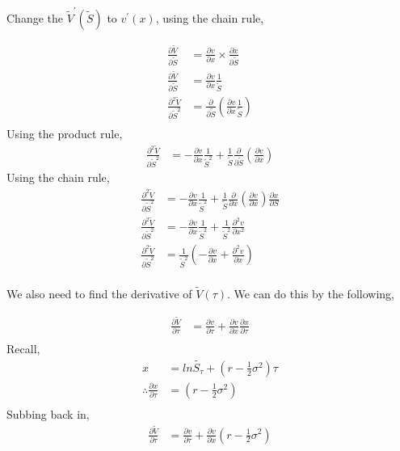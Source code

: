 \documentclass[12pt]{article}
\begin{document}
Change the $\tilde{V}^\prime (\tilde{S})$ to $v^\prime(x)$, using the chain rule,

\begin{align*}
\frac{\partial \tilde{V}}{\partial \tilde{S}} &= \frac{\partial v}{\partial x}\times \frac{\partial x}{\partial \tilde{S}} \\
\frac{\partial \tilde{V}}{\partial \tilde{S}} &= \frac{\partial v}{\partial x}\frac{1}{\tilde{S}} \\
\frac{\partial ^2\tilde{V}}{\partial \tilde{S}^2} &= \frac{\partial}{\partial \tilde{S}}\left(\frac{\partial v}{\partial x}\frac{1}{\tilde{S}}\right) \\
\end{align*}                                     
Using the product rule,
\begin{align*}
\frac{\partial ^2\tilde{V}}{\partial \tilde{S}^2} &= -\frac{\partial v}{\partial x}\frac{1}{\tilde{S}^2} + \frac{1}{\tilde{S}}\frac{\partial}{\partial\tilde{S}}\left(\frac{\partial v}{\partial x}\right)
\end{align*}
Using the chain rule,
\begin{align*}
\frac{\partial ^2\tilde{V}}{\partial \tilde{S}^2} &= -\frac{\partial v}{\partial x}\frac{1}{\tilde{S}^2} + \frac{1}{\tilde{S}}\frac{\partial}{\partial x}\left(\frac{\partial v}{\partial x}\right)\frac{\partial x}{\partial S} \\
\frac{\partial ^2\tilde{V}}{\partial \tilde{S}^2} &= - \frac{\partial v}{\partial x}\frac{1}{\tilde{S}^2} + \frac{1}{\tilde{S}^2}\frac{\partial ^2 v}{\partial x^2} \\
\frac{\partial ^2\tilde{V}}{\partial \tilde{S}^2} &= \frac{1}{\tilde S^2}\left(-\frac{\partial v}{\partial x}+\frac{\partial^2 v}{\partial x}\right)\\
\end{align*}

We also need to find the derivative of $\tilde{V}(\tau)$. We can do this by the following,

\begin{align*}
\frac{\partial\tilde{V}}{\partial\tau} &= \frac{\partial v}{\partial\tau} + \frac{\partial v}{\partial x}\frac{\partial x}{\partial \tau} \\
\end{align*}
Recall,
\begin{align*}
x &= ln{\tilde{S_{\tau}}} + \left(r - \frac{1}{2}\sigma ^2\right)\tau \\
\therefore \frac{\partial x}{\partial \tau} &= \left(r - \frac{1}{2} \sigma ^2\right) \\
\end{align*}
Subbing back in,
\begin{align*}
\frac{\partial\tilde{V}}{\partial\tau} &= \frac{\partial v}{\partial\tau} + \frac{\partial v}{\partial x}\left(r - \frac{1}{2}\sigma^2\right)\\
\end{align*}
\end{document}
